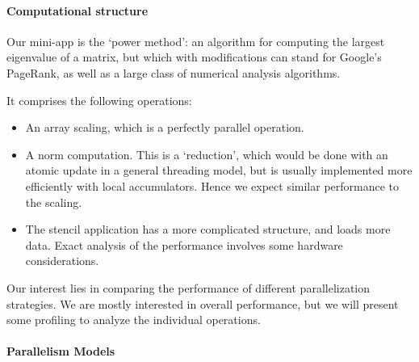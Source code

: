 \documentclass[11pt,fleqn]{artikel3}
\begin{document}
\paragraph*{Computational structure}

Our mini-app is the `power method':
an algorithm for computing the largest eigenvalue
of a matrix, but which with modifications can stand for Google's PageRank,
as well as a large class of numerical analysis algorithms.

\begin{comment}
\begin{quote}
\begin{tabbing}
  Let $A$ be a matrix, and $x,y$ vectors initialized randomly.\\
  For \=$\mathit{iter}=1,\ldots$\\
  \> matrix-vector product: $y\leftarrow Ax$\\
  \> norm: $\alpha= \|y\|_2$ \\
  \> scaling: $x \leftarrow y/\alpha$.
\end{tabbing}
\end{quote}

Asymptotically, $\alpha$ converges to the largest eigenvalue,
and $x$~to the corresponding eigenvector.
In practice, we perform a fixed number of iterations.
\end{comment}

It comprises the following operations:
\begin{itemize}
\item An array scaling, which is a perfectly parallel operation.
\item A norm computation. This is a `reduction', which would be done with an atomic
  update in a general threading model,
  but is usually implemented more efficiently with local
  accumulators. Hence we expect similar performance to the scaling.
\item The stencil application has a more complicated structure,
  and loads more data.
  Exact analysis of the performance involves some hardware considerations.
\end{itemize}

Our interest lies in comparing the performance of different
parallelization strategies.
We are mostly interested in overall performance,
but we will present some profiling to analyze the individual operations.

\paragraph*{Parallelism Models}
\end{document}
